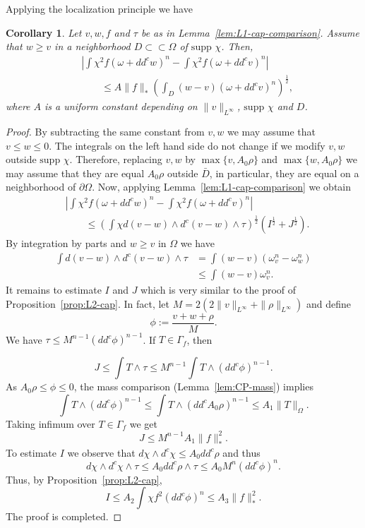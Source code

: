\documentclass{amsart}
\renewcommand{\d}{\partial}
\newcommand{\om}{\omega}
\newcommand{\Ga}{\Gamma}
\newcommand{\Om}{\Omega}
\newcommand{\supp}{\mbox{supp }}
\newtheorem{cor}[thm]{Corollary}
\theoremstyle{definition}
\numberwithin{thm}{section}
\numberwithin{equation}{section}
\renewcommand{\[}{\begin{equation}}
\renewcommand{\]}{\end{equation}}
\newcommand{\wed}{\wedge}
\begin{document}
Applying the localization principle we have 

\begin{cor}\label{cor:L1-cap-comparison-a} Let $v, w, f$ and $\tau$ be  as in Lemma~\ref{lem:L1-cap-comparison}. Assume that $w\geq v$ in a neighborhood $D \subset \subset \Om$ of $\supp\chi$. Then,
$$\begin{aligned}
	&\left|\int \chi^2 f (\om+ dd^c w)^n - \int \chi^2 f  (\om+ dd^c v)^n \right| \\ 
&\quad\quad\leq   A \|f\|_* \left( \int_D  (w-v)(\om+dd^c v)^n \right)^\frac{1}{2},
\end{aligned}$$
where $A$ is a uniform constant depending on $\|v\|_{L^\infty}$, $\supp\chi$ and $D$.
\end{cor}

\begin{proof} By subtracting the same constant  from $v,w$ we may assume that $v\leq w \leq 0$. The integrals on the left hand side  do not change if we modify $v,w$ outside  $\supp\chi$. Therefore, replacing $v, w$ by $\max\{v, A_0\rho\}$ and $\max\{w, A_0 \rho\}$ we may assume that they are equal $A_0\rho$ outside $\bar D$, in particular, they are equal on  a neighborhood of $\d \Om$. Now, applying Lemma~\ref{lem:L1-cap-comparison} we obtain 
$$\begin{aligned}
&\left| \int \chi^2 f (\om+ dd^c w)^n -\int \chi^2 f (\om+ dd^c v)^n \right| \\ 
&\quad\quad \leq \left( \int \chi d(v-w)\wed d^c (v-w) \wed \tau \right)^\frac{1}{2}  (I^\frac{1}{2} + J^\frac{1}{2}).
\end{aligned}$$
By integration by parts and $w \geq v$ in $\Om$  we have 
$$\begin{aligned}
 \int  d(v-w)\wed d^c (v-w) \wed \tau &= \int (w -v) 	(\om_v^n - \om_w^n)\\ &\leq \int (w - v) \om_v^n.
\end{aligned}$$
It remains to estimate $I$ and $J$ which is very similar to the proof of Proposition~\ref{prop:L2-cap}. In fact, let $M = 2(2\|v\|_{L^\infty} + \|\rho\|_{L^\infty})$ and define $$\phi := \frac{v+w + \rho}{M}.$$
We have $\tau \leq M^{n-1} (dd^c\phi)^{n-1}$.
If $T\in \Ga_f$, then 

$$J \leq \int T \wed \tau \leq  M^{n-1}\int T \wed (dd^c\phi)^{n-1}.$$ 
As $A_0\rho \leq \phi \leq 0$, the mass comparison (Lemma~\ref{lem:CP-mass}) implies
$$	
 \int T \wed (dd^c\phi)^{n-1} \leq \int T\wed (dd^c A_0\rho)^{n-1} \leq A_1 \|T\|_\Om.
$$  
Taking infimum over $T\in \Ga_f$ we get $$J \leq M^{n-1} A_1 \|f\|_*^2.$$ 
To estimate $I$ we observe that $d\chi \wed d^c\chi \leq A_0 dd^c \rho$ and thus
$$
	d\chi \wed d^c \chi \wed \tau \leq  A_0 dd^c \rho \wed \tau \leq  A_0M^{n} (dd^c \phi)^{n}.
$$
Thus, by Proposition~\ref{prop:L2-cap},
$$
	I \leq A_2 \int \chi f^2 (dd^c\phi)^n \leq A_3 \|f\|_*^2.
$$
The proof is completed.
\end{proof}
\end{document}
